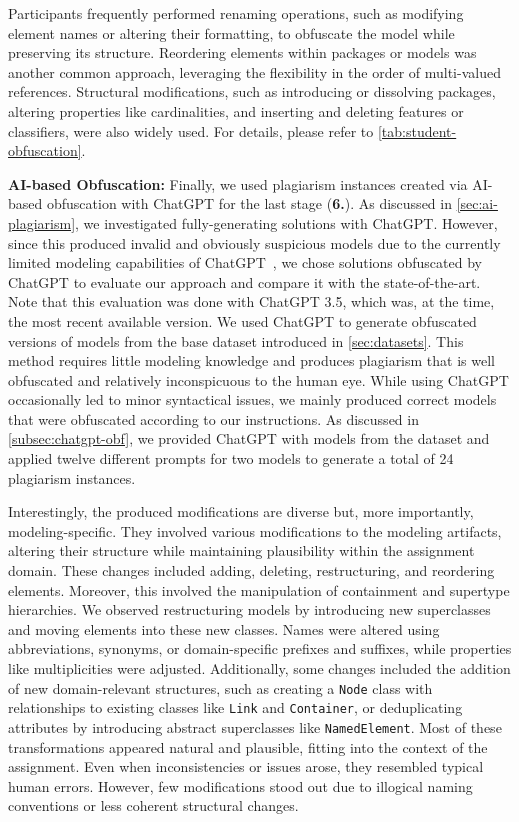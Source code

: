 Participants frequently performed renaming operations, such as modifying element names or altering their formatting, to obfuscate the model while preserving its structure. Reordering elements within packages or models was another common approach, leveraging the flexibility in the order of multi-valued references. Structural modifications, such as introducing or dissolving packages, altering properties like cardinalities, and inserting and deleting features or classifiers, were also widely used. For details, please refer to \autoref{tab:student-obfuscation}.

\textbf{AI-based Obfuscation:}
Finally, we used plagiarism instances created via AI-based obfuscation with ChatGPT for the last stage (\textbf{6.}). 
As discussed in \autoref{sec:ai-plagiarism}, we investigated fully-generating solutions with ChatGPT. However, since this produced invalid and obviously suspicious models due to the currently limited modeling capabilities of ChatGPT~\cite{Camara2023}, we chose solutions obfuscated by ChatGPT to evaluate our approach and compare it with the state-of-the-art.
Note that this evaluation was done with ChatGPT 3.5, which was, at the time, the most recent available version.
%
We used ChatGPT to generate obfuscated versions of models from the base dataset introduced in \autoref{sec:datasets}.
This method requires little modeling knowledge and produces plagiarism that is well obfuscated and relatively inconspicuous to the human eye.
While using ChatGPT occasionally led to minor syntactical issues, we mainly produced correct models that were obfuscated according to our instructions.
As discussed in \autoref{subsec:chatgpt-obf}, we provided ChatGPT with models from the dataset and applied twelve different prompts for two models to generate a total of 24 plagiarism instances.

Interestingly, the produced modifications are diverse but, more importantly, modeling-specific.
They involved various modifications to the modeling artifacts, altering their structure while maintaining plausibility within the assignment domain. These changes included adding, deleting, restructuring, and reordering elements. Moreover, this involved the manipulation of containment and supertype hierarchies. We observed restructuring models by introducing new superclasses and moving elements into these new classes. Names were altered using abbreviations, synonyms, or domain-specific prefixes and suffixes, while properties like multiplicities were adjusted. Additionally, some changes included the addition of new domain-relevant structures, such as creating a \texttt{Node} class with relationships to existing classes like \texttt{Link} and \texttt{Container}, or deduplicating attributes by introducing abstract superclasses like \texttt{NamedElement}.
%
Most of these transformations appeared natural and plausible, fitting into the context of the assignment. Even when inconsistencies or issues arose, they resembled typical human errors. However, few modifications stood out due to illogical naming conventions or less coherent structural changes.

